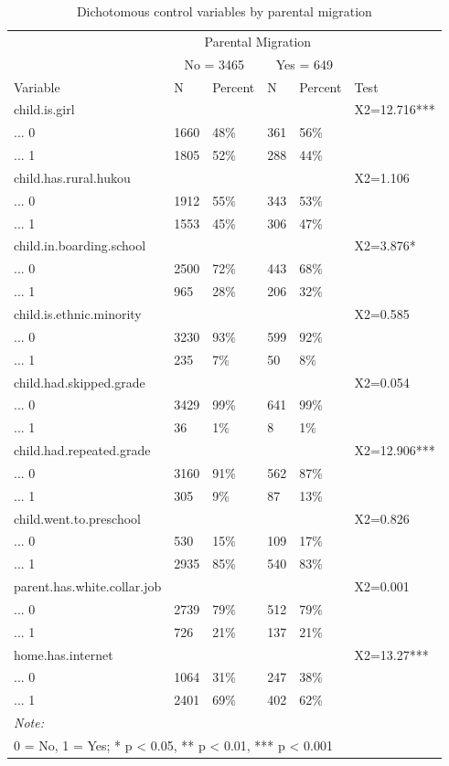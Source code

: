 \documentclass[
  man,floatsintext]{apa7}
\begin{document}
\begin{table}

\caption{\label{tab:tab-ctvar-dit}Dichotomous control variables by parental migration}
\centering
\begin{tabular}[t]{llllll}
\toprule
\multicolumn{1}{c}{ } & \multicolumn{4}{c}{Parental Migration} \\
\cmidrule(l{3pt}r{3pt}){2-5}
\multicolumn{1}{c}{ } & \multicolumn{2}{c}{No = 3465} & \multicolumn{2}{c}{Yes = 649} \\
\cmidrule(l{3pt}r{3pt}){2-3} \cmidrule(l{3pt}r{3pt}){4-5}
Variable & N & Percent & N & Percent & Test\\
\midrule
child.is.girl &  &  &  &  & X2=12.716***\\
... 0 & 1660 & 48\% & 361 & 56\% & \\
... 1 & 1805 & 52\% & 288 & 44\% & \\
child.has.rural.hukou &  &  &  &  & X2=1.106\\
... 0 & 1912 & 55\% & 343 & 53\% & \\
\addlinespace
... 1 & 1553 & 45\% & 306 & 47\% & \\
child.in.boarding.school &  &  &  &  & X2=3.876*\\
... 0 & 2500 & 72\% & 443 & 68\% & \\
... 1 & 965 & 28\% & 206 & 32\% & \\
child.is.ethnic.minority &  &  &  &  & X2=0.585\\
\addlinespace
... 0 & 3230 & 93\% & 599 & 92\% & \\
... 1 & 235 & 7\% & 50 & 8\% & \\
child.had.skipped.grade &  &  &  &  & X2=0.054\\
... 0 & 3429 & 99\% & 641 & 99\% & \\
... 1 & 36 & 1\% & 8 & 1\% & \\
\addlinespace
child.had.repeated.grade &  &  &  &  & X2=12.906***\\
... 0 & 3160 & 91\% & 562 & 87\% & \\
... 1 & 305 & 9\% & 87 & 13\% & \\
child.went.to.preschool &  &  &  &  & X2=0.826\\
... 0 & 530 & 15\% & 109 & 17\% & \\
\addlinespace
... 1 & 2935 & 85\% & 540 & 83\% & \\
parent.has.white.collar.job &  &  &  &  & X2=0.001\\
... 0 & 2739 & 79\% & 512 & 79\% & \\
... 1 & 726 & 21\% & 137 & 21\% & \\
home.has.internet &  &  &  &  & X2=13.27***\\
\addlinespace
... 0 & 1064 & 31\% & 247 & 38\% & \\
... 1 & 2401 & 69\% & 402 & 62\% & \\
\bottomrule
\multicolumn{6}{l}{\rule{0pt}{1em}\textit{Note: }}\\
\multicolumn{6}{l}{\rule{0pt}{1em}0 = No, 1 = Yes; * p < 0.05, ** p < 0.01, *** p < 0.001}\\
\end{tabular}
\end{table}
\end{document}
